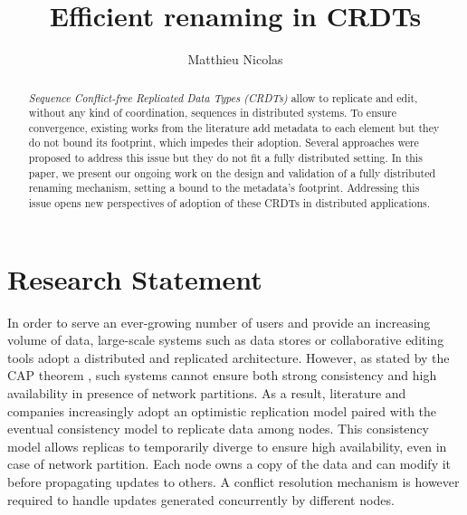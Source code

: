 \documentclass[sigplan]{acmart}
\begin{document}
\title{Efficient renaming in \acp{CRDT}}
\author{Matthieu Nicolas}

\renewcommand{\shortauthors}{M. Nicolas}

\begin{abstract}
    \emph{Sequence Conflict-free Replicated Data Types (CRDTs)} allow to replicate and edit, without any kind of coordination, sequences in distributed systems.
    To ensure convergence, existing works from the literature add metadata to each element but they do not bound its footprint, which impedes their adoption.
    Several approaches were proposed to address this issue but they do not fit a fully distributed setting.
    In this paper, we present our ongoing work on the design and validation of a fully distributed renaming mechanism, setting a bound to the metadata's footprint.
    Addressing this issue opens new perspectives of adoption of these CRDTs in distributed applications.
\end{abstract}

\maketitle

\section{Research Statement}

In order to serve an ever-growing number of users and provide an increasing volume of data,
large-scale systems such as data stores or collaborative editing tools adopt a distributed and replicated architecture.
However, as stated by the CAP theorem \cite{brewer_2000_podc}, such systems cannot ensure both strong consistency and high availability in presence of network partitions.
As a result, literature and companies increasingly adopt an optimistic replication model \cite{saito_2005_optimistic-replication} paired with the eventual consistency model to replicate data among nodes.
This consistency model allows replicas to temporarily diverge to ensure high availability, even in case of network partition.
Each node owns a copy of the data and can modify it before propagating updates to others.
A conflict resolution mechanism is however required to handle updates generated concurrently by different nodes.
\end{document}
